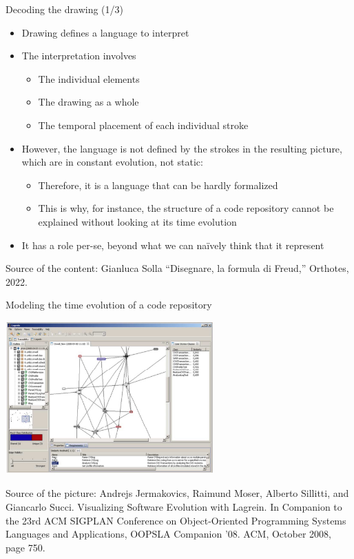 \documentclass{beamer}
\begin{document}
\begin{frame}
{\centerline{Decoding the drawing (1/3)}}
 
\begin{itemize}
   \item Drawing defines a language to interpret
   \item The interpretation involves
   \begin{itemize}
   \item The individual elements
   \item The drawing as a whole
   \item The temporal placement of each individual stroke
\end{itemize} 
  \item However, the language is not defined by the strokes in the resulting picture, which are in constant evolution, not static:
     \begin{itemize}
   \item Therefore, it is a language that can be hardly formalized
   \item This is why, for instance, the structure of a code repository cannot be explained without looking at its time evolution
\end{itemize} 
\item It has a role per-se, beyond what we can na\"{i}vely think that it represent
 \end{itemize} 

\begin{center}
\tiny
Source of the content: Gianluca Solla ``Disegnare, la formula di Freud,'' Orthotes, 2022.
\end{center}
\end{frame}

\begin{frame}
{\centerline{Modeling the time evolution of a code repository}}

\begin{center}
 \includegraphics[width=8cm]{P2023.AIBCCSS.Drawing/Lagrein.jpg}
 
 \end{center}

\begin{center}
\tiny
Source of the picture: Andrejs Jermakovics, Raimund Moser, Alberto Sillitti, and Giancarlo Succi. Visualizing Software Evolution with Lagrein. In Companion to the 23rd ACM SIGPLAN Conference on Object-Oriented Programming Systems Languages and Applications, OOPSLA Companion ’08. ACM, October 2008, page 750.
\end{center}
\end{frame}
\end{document}
